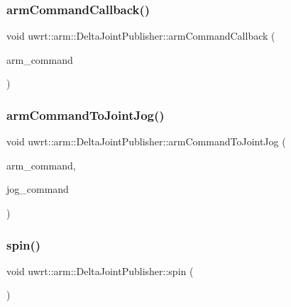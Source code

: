 \subsubsection{\texorpdfstring{arm\+Command\+Callback()}{armCommandCallback()}}
{\footnotesize\ttfamily void uwrt\+::arm\+::\+Delta\+Joint\+Publisher\+::arm\+Command\+Callback (\begin{DoxyParamCaption}\item[{const uwrt\+\_\+arm\+\_\+msgs\+::\+U\+W\+R\+T\+Arm\+Command\+Const\+Ptr \&}]{arm\+\_\+command }\end{DoxyParamCaption})\hspace{0.3cm}{\ttfamily [protected]}}

\mbox{\label{classuwrt_1_1arm_1_1_delta_joint_publisher_a45e0f2e8e7cfdb8dc6794e63844c035a}} 
\subsubsection{\texorpdfstring{arm\+Command\+To\+Joint\+Jog()}{armCommandToJointJog()}}
{\footnotesize\ttfamily void uwrt\+::arm\+::\+Delta\+Joint\+Publisher\+::arm\+Command\+To\+Joint\+Jog (\begin{DoxyParamCaption}\item[{const uwrt\+\_\+arm\+\_\+msgs\+::\+U\+W\+R\+T\+Arm\+Command \&}]{arm\+\_\+command,  }\item[{control\+\_\+msgs\+::\+Joint\+Jog \&}]{jog\+\_\+command }\end{DoxyParamCaption})\hspace{0.3cm}{\ttfamily [protected]}}

\mbox{\label{classuwrt_1_1arm_1_1_delta_joint_publisher_ae552d731968245c249fe30596ea7d1f1}} 
\subsubsection{\texorpdfstring{spin()}{spin()}}
{\footnotesize\ttfamily void uwrt\+::arm\+::\+Delta\+Joint\+Publisher\+::spin (\begin{DoxyParamCaption}{ }\end{DoxyParamCaption})}



